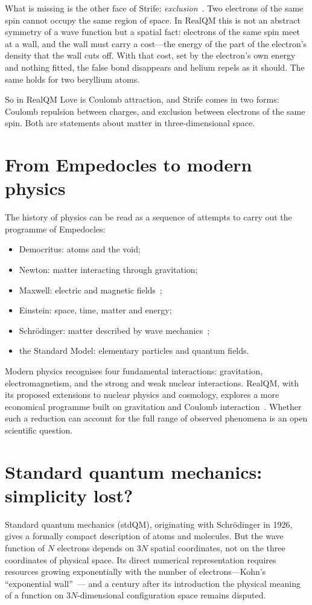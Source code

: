 \documentclass[11pt]{article}
\begin{document}
What is missing is the other face of Strife: \emph{exclusion}~\cite{pauli}. Two electrons of the same spin cannot
occupy the same region of space. In RealQM this is not an abstract symmetry of a wave function but a
spatial fact: electrons of the same spin meet at a wall, and the wall must carry a cost---the energy of
the part of the electron's density that the wall cuts off. With that cost, set by the electron's own
energy and nothing fitted, the false bond disappears and helium repels as it should. The same holds for
two beryllium atoms.

So in RealQM Love is Coulomb attraction, and Strife comes in two forms: Coulomb repulsion between
charges, and exclusion between electrons of the same spin. Both are statements about matter in
three-dimensional space.

\section{From Empedocles to modern physics}

The history of physics can be read as a sequence of attempts to carry out the programme of Empedocles:
\begin{itemize}
\item Democritus: atoms and the void;
\item Newton: matter interacting through gravitation;
\item Maxwell: electric and magnetic fields~\cite{maxwell};
\item Einstein: space, time, matter and energy;
\item Schr\"odinger: matter described by wave mechanics~\cite{schrodinger};
\item the Standard Model: elementary particles and quantum fields.
\end{itemize}
Modern physics recognises four fundamental interactions: gravitation, electromagnetism, and the strong
and weak nuclear interactions. RealQM, with its proposed extensions to nuclear physics and cosmology,
explores a more economical programme built on gravitation and Coulomb interaction~\cite{realqm}. Whether such a
reduction can account for the full range of observed phenomena is an open scientific question.

\section{Standard quantum mechanics: simplicity lost?}

Standard quantum mechanics (stdQM), originating with Schr\"odinger in 1926, gives a formally compact
description of atoms and molecules. But the wave function of $N$ electrons depends on $3N$ spatial
coordinates, not on the three coordinates of physical space. Its direct numerical representation
requires resources growing exponentially with the number of electrons---Kohn's ``exponential wall''~\cite{kohn99}--- and a century after its
introduction the physical meaning of a function on $3N$-dimensional configuration space remains disputed.
\end{document}
